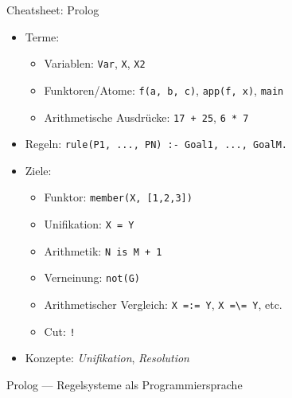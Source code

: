 \documentclass{beamer}
\begin{document}
\begin{frame}{Cheatsheet: Prolog}
  \begin{itemize}
    \item Terme:
    \begin{itemize}
      \item Variablen: \texttt{Var}, \texttt{X}, \texttt{X2}
      \item Funktoren/Atome: \texttt{f(a, b, c)}, \texttt{app(f, x)}, \texttt{main}
      \item Arithmetische Ausdrücke: \texttt{17 + 25}, \texttt{6 * 7}
    \end{itemize}
    \item Regeln: \texttt{rule(P1, ..., PN) :- Goal1, ..., GoalM.}
    \item Ziele:
    \begin{itemize}
      \item Funktor: \texttt{member(X, [1,2,3])}
      \item Unifikation: \texttt{X = Y}
      \item Arithmetik: \texttt{N is M + 1}
      \item Verneinung: \texttt{not(G)}
      \item Arithmetischer Vergleich: \texttt{X =:= Y}, \texttt{X =\textbackslash= Y}, etc.
      \item Cut: \texttt{!}
    \end{itemize}
    \item Konzepte: \emph{Unifikation}, \emph{Resolution}
  \end{itemize}
\end{frame}

\begin{frame}{Prolog --- Regelsysteme als Programmiersprache}

  \vfill


\end{frame}
\end{document}
